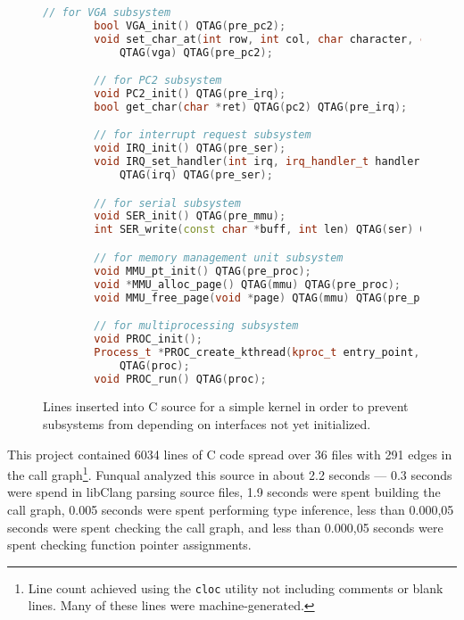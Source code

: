\begin{figure}
    \begin{lstlisting}[language=c++,gobble=8]
        // for VGA subsystem
        bool VGA_init() QTAG(pre_pc2);
        void set_char_at(int row, int col, char character, char attributes)
            QTAG(vga) QTAG(pre_pc2);

        // for PC2 subsystem
        void PC2_init() QTAG(pre_irq);
        bool get_char(char *ret) QTAG(pc2) QTAG(pre_irq);

        // for interrupt request subsystem
        void IRQ_init() QTAG(pre_ser);
        void IRQ_set_handler(int irq, irq_handler_t handler, void *args)
            QTAG(irq) QTAG(pre_ser);

        // for serial subsystem
        void SER_init() QTAG(pre_mmu);
        int SER_write(const char *buff, int len) QTAG(ser) QTAG(pre_mmu);

        // for memory management unit subsystem
        void MMU_pt_init() QTAG(pre_proc);
        void *MMU_alloc_page() QTAG(mmu) QTAG(pre_proc);
        void MMU_free_page(void *page) QTAG(mmu) QTAG(pre_proc);

        // for multiprocessing subsystem
        void PROC_init();
        Process_t *PROC_create_kthread(kproc_t entry_point, void *arg)
            QTAG(proc);
        void PROC_run() QTAG(proc);
    \end{lstlisting}
    \caption{Lines inserted into C source for a simple kernel in order to prevent subsystems from depending on interfaces not yet initialized.}
    \label{lst:app:pre-malloc:annote}
\end{figure}

\pagebreak

This project contained 6034 lines of C code spread over 36 files with 291 edges in the call graph\footnote{Line count achieved using the \lstinline{cloc} utility not including comments or blank lines.  Many of these lines were machine-generated.}.  Funqual analyzed this source in about 2.2 seconds --- 0.3 seconds were spend in libClang parsing source files, 1.9 seconds were spent building the call graph, 0.005 seconds were spent performing type inference, less than 0.000,05 seconds were spent checking the call graph, and less than 0.000,05 seconds were spent checking function pointer assignments.  


